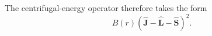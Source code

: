 The centrifugal-energy operator therefore takes the form
\[
B(r)(\widehat{\mathbf J}-\widehat{\mathbf L}-\widehat{\mathbf S})^2.
\]
